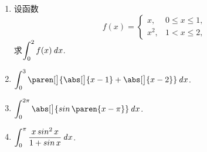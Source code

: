 \documentclass[a4paper,punct=CCT]{ctexbook}
\theoremstyle{definition}
\theoremstyle{remark}
\newif\ifshowsol
\let\leq\leqslant
\let\le\leq
\begin{document}
\begin{enumerate}
\item 设函数
  \[
    f(x) =
    \begin{cases}
      x, & 0 \le x \le 1, \\
      x^2, & 1 < x \le 2,
    \end{cases}
  \]
  求\(\displaystyle \int_0^2 f(x) \mathop{}\!\mathit{d} x\).

  \ifshowsol
  \[
    \int_0^2 f(x) \dx
    = \int_0^1 f(x) \dx + \int_1^2 f(x) \dx
    = \frac{x^2}{2} \bigg\vert_0^1 + \frac{x^3}{3} \bigg\vert_1^2
    = \frac{17}{6}.
  \]
  \fi

\item \(\displaystyle \int_0^3 \paren[\big]{\abs[\big]{x-1} + \abs[\big]{x-2}} \dx\).

  \ifshowsol
  \[
    \begin{split}
      \int_0^3 \paren[\big]{\abs[\big]{x-1} + \abs[\big]{x-2}} \dx
      &= \int_0^1 \paren{3-2x} \dx + \int_1^2 \dx + \int_2^3 \paren{2x-3} \dx \\
      &= \paren{3x-x^2} \Big\vert_0^1 + 1 + \paren{x^2 - 3x} \Big\vert_2^3 \\
      &= 2 + 1 + 2 = 5.
    \end{split}
  \]
  \fi

\item \(\displaystyle \int_0^{2\pi} \abs[\big]{\sin\paren{x-\pi}} \dx\).

  \ifshowsol
  \[
    \int_0^{2\pi} \abs[\big]{\sin\paren{x-\pi}} \dx
    = \int_0^{2\pi} \abs[\big]{- \sin x} \dx
    = \int_0^{2\pi} \abs[\big]{\sin x} \dx
    = 2 \int_0^{\pi} \abs[\big]{\sin x} \dx
    = 2 \int_0^{\pi} \sin x \dx
    = 4.
  \]
  \fi

\item \(\displaystyle \int_0^\pi \frac{x \operatorname{\smash{sin}}^2 x}{1 + \operatorname{\smash{sin}} x} \mathop{}\!\mathit{d} x\).


\end{enumerate}
\end{document}
